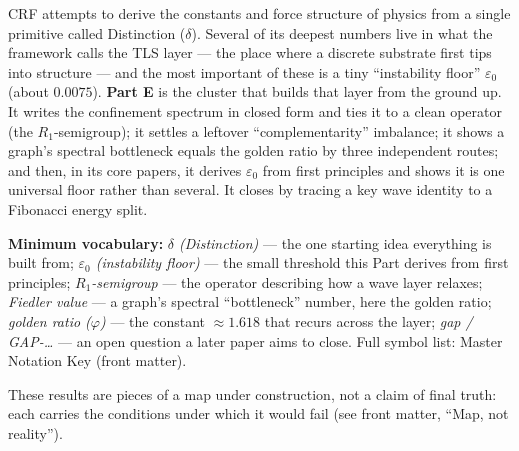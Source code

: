 \documentclass[12pt, a4paper]{article}
\begin{document}
\begin{abstract}
\textbf{Multi-Part Single Volume.} Parts~A, B, C, D, and E share one
conceptual atomic-numbering namespace and one cross-reference system.
The PDF outputs combine via
\texttt{pdfunite Part\_A.pdf Part\_B.pdf Part\_C.pdf Part\_D.pdf
Part\_E.pdf CRF\_Complete\_v17\_7.pdf}.
Logically: one book; mechanically: five files for compile reliability.

\textbf{CRF-Specific Lock.} The locked items remain unchanged from
v17.6: $d_s$ definition, scaling laws, phase structure, invariants,
normalisation ($n_m = 5$, $d_s = 3$). No \texttt{[CRITICAL CHANGE
FLAG]} is raised. All updates are forward closures or strictly
additive extensions. No silent deletion has occurred --- all v17.6
content is preserved verbatim in Parts~A--D; Part~E is strictly
additive.
\end{abstract}

\tableofcontents
\newpage

\begin{keybox}[title={If you are just arriving --- Part E in plain language}]
\sloppy
CRF attempts to derive the constants and force structure of physics from a
single primitive called Distinction ($\delta$). Several of its deepest numbers
live in what the framework calls the TLS layer --- the place where a discrete
substrate first tips into structure --- and the most important of these is a
tiny ``instability floor'' $\varepsilon_0$ (about $0.0075$). \textbf{Part E} is
the cluster that builds that layer from the ground up. It writes the confinement
spectrum in closed form and ties it to a clean operator (the $R_1$-semigroup);
it settles a leftover ``complementarity'' imbalance; it shows a graph's spectral
bottleneck equals the golden ratio by three independent routes; and then, in its
core papers, it derives $\varepsilon_0$ from first principles and shows it is one
universal floor rather than several. It closes by tracing a key wave identity to
a Fibonacci energy split.

\textbf{Minimum vocabulary:}
\textit{$\delta$ (Distinction)} --- the one starting idea everything is built
from;\;
\textit{$\varepsilon_0$ (instability floor)} --- the small threshold this Part
derives from first principles;\;
\textit{$R_1$-semigroup} --- the operator describing how a wave layer relaxes;\;
\textit{Fiedler value} --- a graph's spectral ``bottleneck'' number, here the
golden ratio;\;
\textit{golden ratio ($\varphi$)} --- the constant $\approx1.618$ that recurs
across the layer;\;
\textit{gap / GAP-\dots} --- an open question a later paper aims to close.
Full symbol list: Master Notation Key (front matter).

These results are pieces of a map under construction, not a claim of final
truth: each carries the conditions under which it would fail (see front
matter, ``Map, not reality'').
\end{keybox}
\end{document}
